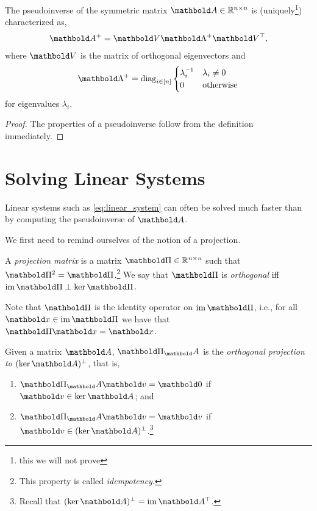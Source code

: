 \begin{lem}
The pseudoinverse of the symmetric matrix $\mA \in \R^{n \times n}$ is (uniquely\footnote{this we will not prove}) characterized as, \begin{align}
    \pinv{\mA} = \mV\pinv{\mLambda}\trans{\mV},
\end{align} where $\mV$ is the matrix of orthogonal eigenvectors and \begin{align}
    \pinv{\mLambda} = \diag_{i\in[n]}\begin{cases}
    \inv{\lambda_i} & \lambda_i \neq 0 \\
    0 & \text{otherwise}
    \end{cases} \label{eq:pseudoinverse_spectrum}
\end{align} for eigenvalues $\lambda_i$.
\end{lem}
\begin{proof}
The properties of a pseudoinverse follow from the definition immediately.
\end{proof}

\section{Solving Linear Systems}

Linear systems such as \cref{eq:linear_system} can often be solved much faster than by computing the pseudoinverse of $\mA$.

We first need to remind ourselves of the notion of a projection.

\begin{defn} A \emph{projection matrix} is a matrix $\mPi \in \R^{n \times n}$ such that $\mPi^2 = \mPi$.\footnote{This property is called \emph{idempotency}.} We say that $\mPi$ is \emph{orthogonal} iff $\im\mPi \perp \ker\mPi$.
\end{defn}
\begin{rmk}
Note that $\mPi$ is the identity operator on $\im\mPi$, i.e., for all $\vx \in \im\mPi$ we have that $\mPi\vx = \vx$.
\end{rmk}

\begin{defn} Given a matrix $\mA$, $\mPi_\mA$ is the \emph{orthogonal projection to $\compl{(\ker{\mA})}$}, that is, \begin{enumerate}
    \item $\mPi_\mA \vv = \vZero$ if $\vv \in \ker{\mA}$; and
    \item $\mPi_\mA \vv = \vv$ if $\vv \in \compl{(\ker{\mA})}$.\footnote{Recall that $\compl{(\ker{\mA})} = \im{\trans{\mA}}$.}
\end{enumerate}
\end{defn}

